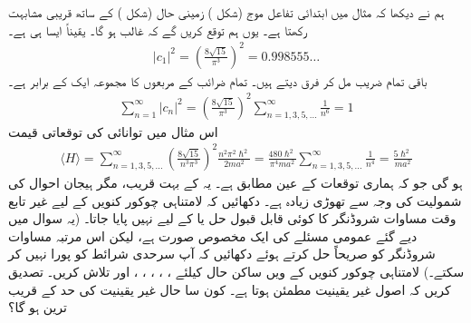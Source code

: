 ہم نے دیکھا کہ مثال  میں ابتدائی تفاعل موج (شکل )  زمینی حال  (شکل ) کے ساتھ قریبی مشابہت رکھتا ہے۔ یوں ہم توقع کریں گے کہ  غالب ہو گا۔ یقیناً ایسا ہی ہے۔
\begin{align*}
\left| c_{1} \right|^{2} = \left( \frac{8\sqrt{15}}{\pi^{3}} \right)^{2} = 0.998555 \dotso
\end{align*}
باقی تمام  ضریب  مل کر فرق  دیتے ہیں۔ تمام ضرائب کے مربعوں کا مجموعہ  ایک  کے برابر ہے۔
\begin{align*}
\sum_{n=1}^{\infty} \left| c_{n} \right|^{2} = \left( \frac{8\sqrt{15}}{\pi^{3}} \right)^{2} \sum_{n=1,3,5,...}^{\infty} \frac{1}{n^{6}} = 1
\end{align*}
اس مثال میں توانائی کی توقعاتی قیمت
\begin{align*}
\langle H \rangle = \sum_{n=1,3,5,...}^{\infty} \left( \frac{8\sqrt{15}}{n^{3} \pi^{3}} \right)^{2} \frac{n^{2} \pi^{2} \hslash^{2}}{2ma^{2}} = \frac{480\hslash^{2}}{\pi^{4} ma^{2}} \sum_{n=1,3,5,...}^{\infty} \frac{1}{n^{4}} = \frac{5 \hslash^{2}}{ma^{2}}
\end{align*}
 ہو گی جو کہ ہماری توقعات کے عین مطابق ہے۔ یہ  کے بہت قریب، مگر ہیجان احوال کی شمولیت کی وجہ سے تھوڑی زیادہ ہے۔ 
 دکھائیں کہ لامتناہی چوکور کنویں کے لیے غیر تابع وقت مساوات شروڈنگر کا کوئی  قابل قبول حل    یا    کے لیے   نہیں پایا جاتا۔ (یہ سوال  میں دیے گئے عمومی مسئلے کی ایک مخصوص صورت ہے، لیکن اس مرتبہ مساوات شروڈنگر کو صریحاً حل کرتے ہوئے دکھائیں کہ آپ سرحدی شرائط کو پورا نہیں کر سکتے۔)
لامتناہی چوکور کنویں کے    ویں ساکن حال کیلئے ، ، ، ، ، اور   تلاش کریں۔ تصدیق کریں کہ اصول غیر یقینیت مطمئن ہوتا ہے۔ کون سا حال غیر یقینیت کی حد کے قریب ترین ہو گا؟
